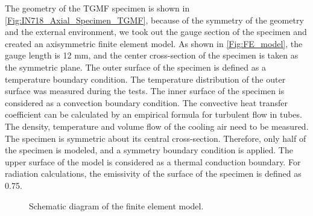 \documentclass[preprint,5p,twocolumn,11pt,sort&compress]{elsarticle}
\begin{document}
The geometry of the TGMF specimen is shown in \autoref{Fig:IN718_Axial_Specimen_TGMF}, because of the symmetry of the geometry and the external environment, we took out the gauge section of the specimen and created an axisymmetric finite element model. As shown in \autoref{Fig:FE_model}, the gauge length is 12 mm, and the center cross-section of the specimen is taken as the symmetric plane.
The outer surface of the specimen is defined as a temperature boundary condition. The temperature distribution of the outer surface was measured during the tests. The inner surface of the specimen is considered as a convection boundary condition. The convective heat transfer coefficient can be calculated by an empirical formula for turbulent flow in tubes. The density, temperature and volume flow of the cooling air need to be measured. The specimen is symmetric about its central cross-section. Therefore, only half of the specimen is modeled, and a symmetry boundary condition is applied.
The upper surface of the model is considered as a thermal conduction boundary. For radiation calculations, the emissivity of the surface of the specimen is defined as 0.75.

\begin{figure}[!htp]
  \caption{Schematic diagram of the finite element model.}
  \label{Fig:FE_model}
\end{figure}
\end{document}
